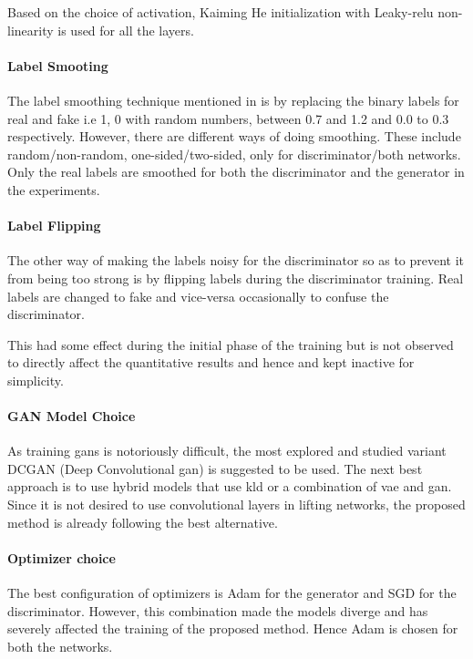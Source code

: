 Based on the choice of activation, Kaiming He initialization with Leaky-\ac{relu} non-linearity is used for all the layers.

\paragraph{Label Smooting}
The label smoothing technique mentioned in \cite{gan_hacks} is by replacing the binary labels for real and fake i.e 1, 0 with random numbers, between 0.7 and 1.2 and 0.0 to 0.3 respectively. However, there are different ways of doing smoothing. These include random/non-random, one-sided/two-sided, only for discriminator/both networks. Only the real labels are smoothed for both the discriminator and the generator in the experiments. 

\paragraph{Label Flipping}
The other way of making the labels noisy for the discriminator so as to prevent it from being too strong is by flipping labels during the discriminator training. Real labels are changed to fake and vice-versa occasionally to confuse the discriminator. 

This had some effect during the initial phase of the training but is not observed to directly affect the quantitative results and hence and kept inactive for simplicity.

\paragraph{GAN Model Choice} 
As training \acp{gan} is notoriously difficult, the most explored and studied variant DCGAN (Deep Convolutional \ac{gan}) is suggested to be used. The next best approach is to use hybrid models that use \ac{kld} or a combination of \ac{vae} and \ac{gan}. Since it is not desired to use convolutional layers in lifting networks, the proposed method is already following the best alternative.


\paragraph{Optimizer choice}
The best configuration of optimizers is Adam for the generator and SGD for the discriminator. However, this combination made the models diverge and has severely affected the training of the proposed method. Hence Adam is chosen for both the networks.

